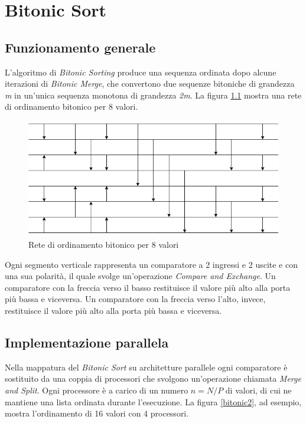 \chapter{Bitonic Sort} \label{chap.BitonicSort}

\section{Funzionamento generale}

L'algoritmo di \textit{Bitonic Sorting} produce una sequenza ordinata dopo alcune iterazioni di \textit{Bitonic Merge}, che convertono due sequenze bitoniche di grandezza \textit{m} in un'unica sequenza monotona di grandezza \textit{2m}.
La figura \ref{bitonic1} mostra una rete di ordinamento bitonico per 8 valori.

\begin{figure}[h!]
  \centering
  \includegraphics[width=\linewidth]{Images/bitonic1.png}
  \caption{Rete di ordinamento bitonico per 8 valori}
  \label{bitonic1}
\end{figure}

Ogni segmento verticale rappresenta un comparatore a 2 ingressi e 2 uscite e con una sua polarità, il quale svolge un'operazione \textit{Compare and Exchange}. Un comparatore con la freccia verso il basso restituisce il valore più alto alla porta più bassa e viceversa. Un comparatore con la freccia verso l'alto, invece, restituisce il valore più alto alla porta più bassa e viceversa.

\section{Implementazione parallela}

Nella mappatura del \textit{Bitonic Sort} su architetture parallele ogni comparatore è sostituito da una coppia di processori che svolgono un'operazione chiamata \textit{Merge and Split}. Ogni processore è a carico di un numero $n = N / P$ di valori, di cui ne mantiene una lista ordinata durante l'esecuzione. La figura \ref{bitonic2}, ad esempio, mostra l'ordinamento di 16 valori con 4 processori.

